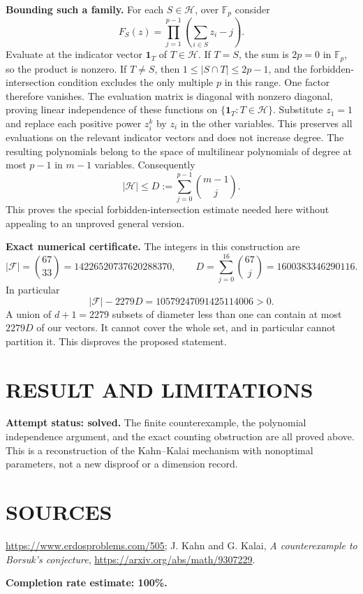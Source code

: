 \textbf{Bounding such a family.} For each $S\in\mathcal H$, over $\mathbb F_p$ consider
\[
 F_S(z)=\prod_{j=1}^{p-1}\left(\sum_{i\in S}z_i-j\right).
\]
Evaluate at the indicator vector $\mathbf1_T$ of $T\in\mathcal H$. If $T=S$, the sum is $2p=0$ in $\mathbb F_p$, so the product is nonzero. If $T\ne S$, then $1\leq |S\cap T|\leq2p-1$, and the forbidden-intersection condition excludes the only multiple $p$ in this range. One factor therefore vanishes. The evaluation matrix is diagonal with nonzero diagonal, proving linear independence of these functions on $\{\mathbf1_T:T\in\mathcal H\}$.
Substitute $z_1=1$ and replace each positive power $z_i^k$ by $z_i$ in the other variables. This preserves all evaluations on the relevant indicator vectors and does not increase degree. The resulting polynomials belong to the space of multilinear polynomials of degree at most $p-1$ in $m-1$ variables. Consequently
\[
 |\mathcal H|\leq D:=\sum_{j=0}^{p-1}\binom{m-1}{j}.
\]
This proves the special forbidden-intersection estimate needed here without appealing to an unproved general version.

\textbf{Exact numerical certificate.} The integers in this construction are
\[
 |\mathcal F|=\binom{67}{33}=14226520737620288370,
 \qquad D=\sum_{j=0}^{16}\binom{67}{j}=1600383346290116.
\]
In particular
\[
 |\mathcal F|-2279D=10579247091425114006>0.
\]
A union of $d+1=2279$ subsets of diameter less than one can contain at most $2279D$ of our vectors. It cannot cover the whole set, and in particular cannot partition it. This disproves the proposed statement.

\section{RESULT AND LIMITATIONS}
\textbf{Attempt status: solved.} The finite counterexample, the polynomial independence argument, and the exact counting obstruction are all proved above. This is a reconstruction of the Kahn--Kalai mechanism with nonoptimal parameters, not a new disproof or a dimension record.

\section{SOURCES}
\url{https://www.erdosproblems.com/505}; J. Kahn and G. Kalai, \emph{A counterexample to Borsuk's conjecture}, \url{https://arxiv.org/abs/math/9307229}.

\textbf{Completion rate estimate: 100\%.}
